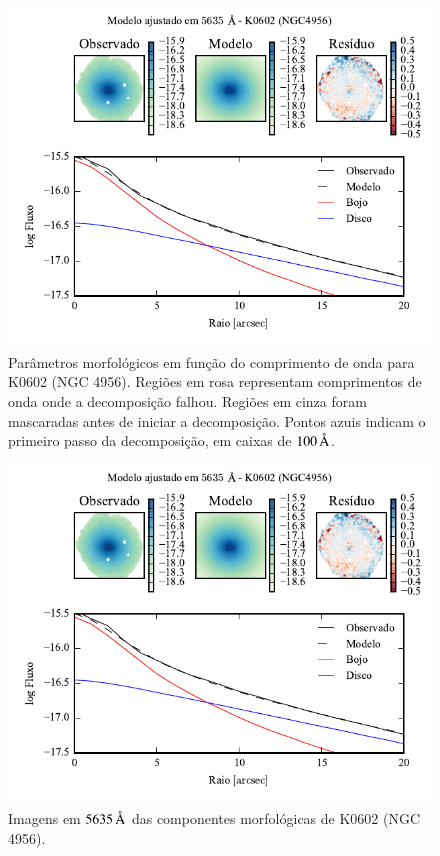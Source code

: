\begin{figure}
	\includegraphics[page=2]{figuras-decomp/K0602_sample006a}
	\caption[Parâmetros morfológicos em função do comprimento de onda de K0602
	(NGC 4956)]
	{Parâmetros morfológicos em função do comprimento de onda para
	K0602 (NGC 4956). Regiões em rosa representam comprimentos de onda onde a
	decomposição falhou. Regiões em cinza foram mascaradas antes de iniciar a
	decomposição. Pontos azuis indicam o primeiro passo da decomposição, em caixas
	de $100\,\text{\normalfont\AA}$.}
	\label{fig:decompParams:K0602}
\end{figure}

\begin{figure}
	\includegraphics[page=3]{figuras-decomp/K0602_sample006a}
	\caption[Imagens em $5635\,\angstrom$ das componentes morfológicas de K0602
	(NGC 4956)]
	{Imagens em $5635\,\angstrom$ das componentes morfológicas de K0602
	(NGC 4956).}
	\label{fig:decompImages:K0602}
\end{figure}


